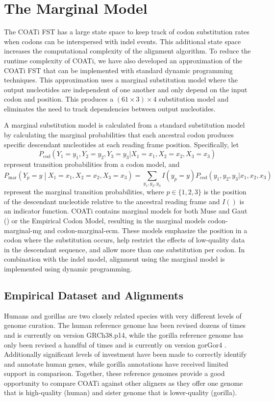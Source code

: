 \documentclass[12pt,letterpaper]{article}
\begin{document}
\section*{The Marginal Model}

The COATi FST has a large state space to keep track of codon substitution rates when codons can be interspersed with indel events. This additional state space increases the computational complexity of the alignment algorithm. To reduce the runtime complexity of COATi, we have also developed an approximation of the COATi FST that can be implemented with standard dynamic programming techniques. This approximation uses a marginal substitution model where the output nucleotides are independent of one another and only depend on the input codon and position. This produces a $\left(61 \times 3 \right) \times 4$ substitution model and eliminates the need to track dependencies between output nucleotides.

A marginal substitution model is calculated from a standard substitution model by calculating the marginal probabilities that each ancestral codon produces specific descendant nucleotides at each reading frame position. Specifically, let
%
\[
P_\text{cod}\left( Y_1 = y_1, Y_2 = y_2, Y_3 = y_3 |
                   X_1 = x_1, X_2 = x_2, X_3 = x_3 \right)
\]
%
represent transition probabilities from a codon model, and
%
\[
P_\text{mar}\left(Y_p = y \middle| X_1 = x_1, X_2 = x_2, X_3 = x_3 \right)
=
\sum_{y_1, y_2, y_3} I(y_p = y)
P_\text{cod}\left( y_1, y_2, y_3 |
                   x_1, x_2, x_3 \right)
\]
%
represent the marginal transition probabilities, where $p \in \{1, 2, 3\}$ is the position of the descendant nucleotide relative to the ancestral reading frame and $I()$ is an indicator function. COATi contains marginal models for both Muse and Gaut (\citeyear{muse_gaut_1994}) or the Empirical Codon Model, resulting in the marginal models codon-marginal-mg and codon-marginal-ecm. These models emphasize the position in a codon where the substitution occurs, help restrict the effects of low-quality data in the descendant sequence, and allow more than one substitution per codon. In combination with the indel model, alignment using the marginal model is implemented using dynamic programming.

\subsection*{Empirical Dataset and Alignments}

Humans and gorillas are two closely related species with very different levels of genome curation. The human reference genome has been revised dozens of times and is currently on version GRCh38.p14, while the gorilla reference genome has only been revised a handful of times and is currently on version gorGor4 \citep[cf.\ ENSEMBL database v110;][]{ensembl_hubbard_2002}. Additionally significant levels of investment have been made to correctly identify and annotate human genes, while gorilla annotations have received limited support in comparison. Together, these reference genomes provide a good opportunity to compare COATi against other aligners as they offer one genome that is high-quality (human) and sister genome that is lower-quality (gorilla).
\end{document}
